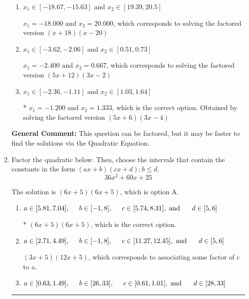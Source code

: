 \documentclass{extbook}[14pt]
\newcommand{\litem}[1]{\item #1

\rule{\textwidth}{0.4pt}}
\begin{document}
\begin{enumerate}
{\begin{enumerate}[label=\Alph*.]
$x_1 = -6.000 \text{ and } x_2 = 0.267$, which corresponds to solving the factored version $(x + 6)(15x -4)$
\item \( x_1 \in [-18.67, -15.63] \text{ and } x_2 \in [19.39, 20.5] \)

$x_1 = -18.000 \text{ and } x_2 = 20.000$, which corresponds to solving the factored version $(x + 18)(x -20)$
\item \( x_1 \in [-3.62, -2.06] \text{ and } x_2 \in [0.51, 0.73] \)

$x_1 = -2.400 \text{ and } x_2 = 0.667$, which corresponds to solving the factored version $(5x + 12)(3x -2)$
\item \( x_1 \in [-2.36, -1.11] \text{ and } x_2 \in [1.03, 1.64] \)

* $x_1 = -1.200 \text{ and } x_2 = 1.333$, which is the correct option. Obtained by solving the factored version $(5x + 6)(3x -4)$
\end{enumerate}

\textbf{General Comment:} This question can be factored, but it may be faster to find the solutions via the Quadratic Equation.
}
\litem{
Factor the quadratic below. Then, choose the intervals that contain the constants in the form $(ax+b)(cx+d); b \leq d.$
\[ 36x^{2} +60 x + 25 \]

The solution is \( (6x + 5)(6x + 5) \), which is option A.\begin{enumerate}[label=\Alph*.]
\item \( a \in [5.81, 7.04], \hspace*{5mm} b \in [-1, 8], \hspace*{5mm} c \in [5.74, 8.31], \text{ and } \hspace*{5mm} d \in [5, 6] \)

* $(6x + 5)(6x + 5)$, which is the correct option.
\item \( a \in [2.71, 4.49], \hspace*{5mm} b \in [-1, 8], \hspace*{5mm} c \in [11.27, 12.45], \text{ and } \hspace*{5mm} d \in [5, 6] \)

 $(3x + 5)(12x + 5)$, which corresponds to associating some factor of c to a.
\item \( a \in [0.63, 1.49], \hspace*{5mm} b \in [26, 33], \hspace*{5mm} c \in [0.61, 1.01], \text{ and } \hspace*{5mm} d \in [28, 33] \)


\end{enumerate}}
\end{enumerate}
\end{document}
